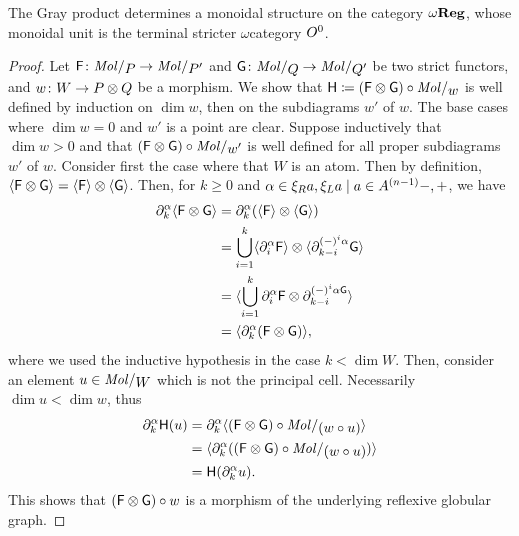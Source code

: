 \begin{prop} \label{prop:gray_stricter_regular_complex_monoidal}
    The Gray product determines a monoidal structure on the category \( \omega\mathbf{Reg} \), whose monoidal unit is the terminal stricter \( \omega \)\nbd category \( O^{0} \).
\end{prop}
\begin{proof}
    Let \( \F \colon \molecin{P} \to \molecin{P'} \) and \( \G \colon \molecin{Q} \to \molecin{Q'} \) be two strict functors, and \( w \colon W \to P \otimes Q \) be a morphism.
    We show that \( \fun{H} \eqdef (\F \gray \G) \after \molecin{w} \) is well defined by induction on \( \dim w \), then on the subdiagrams \( w' \) of \( w \).
    The base cases where \( \dim w = 0 \) and \( w' \) is a point are clear.
    Suppose inductively that \( \dim w > 0 \) and that \( (\F \gray \G) \after \molecin{w'} \) is well defined for all proper subdiagrams \( w' \) of \( w \).
    Consider first the case where that \( W \) is an atom.
    Then by definition, \( \langle\mathsf{F} \otimes \mathsf{G}\rangle = \langle\mathsf{F}\rangle \otimes \langle\mathsf{G}\rangle \).
    Then, for \( k \geq 0 \) and \( \a \in \set{-, +} \), we have
    \begin{align*}
        \partial_{k}^{\alpha} \langle\mathsf{F} \otimes \mathsf{G}\rangle &= \partial_{k}^{\alpha} (\langle\mathsf{F}\rangle \otimes \langle\mathsf{G}\rangle) \\
                                       &= \bigcup_{i = 1}^k \langle\partial_{i}^{\alpha} \mathsf{F}\rangle \otimes \langle\partial_{k - i}^{(-)^i\alpha} \mathsf{G}\rangle \\
                                       &= \langle\bigcup_{i = 1}^k \partial_{i}^{\alpha} \mathsf{F} \otimes \partial_{k - i}^{(-)^i\alpha \mathsf{G}}\rangle \\
                                       &= \langle\partial_{k}^{\alpha} (\mathsf{F} \otimes \mathsf{G})\rangle,
    \end{align*}
    where we used the inductive hypothesis in the case \( k < \dim W \).
    Then, consider an element \( u \in \molecin{W} \) which is not the principal cell. 
    Necessarily \( \dim u < \dim w \), thus
    \begin{align*}
        \bd{k}{\a} \fun{H}(u) &= \bd{k}{\a} \pcell{(\F \gray \G) \after \molecin{(w \after u)}} \\
                                                         &= \pcell{\bd{k}{\a} ((\F \gray \G) \after \molecin{(w \after u)})} \\
                                                         &= \fun{H}(\bd{k}{\a} u).
    \end{align*}
    This shows that \( (\mathsf{F} \otimes \mathsf{G}) \circ w \) is a morphism of the underlying reflexive globular graph. 

\end{proof}
